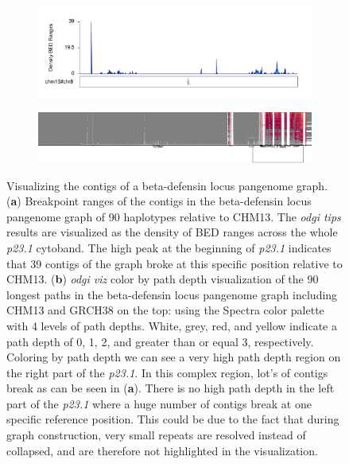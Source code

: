 \begin{figure}[ht!]
	\begin{subfigure}{\linewidth}
		\caption{}
		\centering
		\includegraphics[width=1.0\linewidth, trim=0cm 2cm 0cm 2cm]{fig/tips/chr8_chm13_beta_defensin_locus_odgi_tips_w50000_karyoploteR}
		\label{fig:tips-karyo}
	\end{subfigure}
	\begin{subfigure}{\linewidth}
	\caption{}
	\centering
	\includegraphics[width=1.0\linewidth, trim=-10cm 6cm -3.4cm 3cm]{fig/tips/chr8_pan_fa_c3d3224_7748b33.395c7f4_smooth_og_Y_og_p23_1_og_90paths_m}
	\label{fig:tips-viz}
\end{subfigure}
	\caption{Visualizing the contigs of a beta-defensin locus pangenome graph. (\textbf{a}) Breakpoint ranges of the contigs in the beta-defensin locus pangenome graph of 90 haplotypes relative to CHM13. The \textit{odgi tips} results are visualized as the density of BED ranges across the whole \textit{p23.1} cytoband. The high peak at the beginning of \textit{p23.1} indicates that 39 contigs of the graph broke at this specific position relative to CHM13. (\textbf{b}) \textit{odgi viz} color by path depth visualization of the 90 longest paths in the beta-defensin locus pangenome graph including CHM13 and GRCH38 on the top: using the Spectra color palette with 4 levels of path depths. White, grey, red, and yellow indicate a path depth of 0, 1, 2, and greater than or equal 3, respectively. Coloring by path depth we can see a very high path depth region on the right part of the  \textit{p23.1}. In this complex region, lot's of contigs break as can be seen in (\textbf{a}). There is no high path depth in the left part of the \textit{p23.1} where a huge number of contigs break at one specific reference position. This could be due to the fact that during graph construction, very small repeats are resolved instead of collapsed, and are therefore not highlighted in the visualization.}
	\label{fig:tips}
\end{figure}

